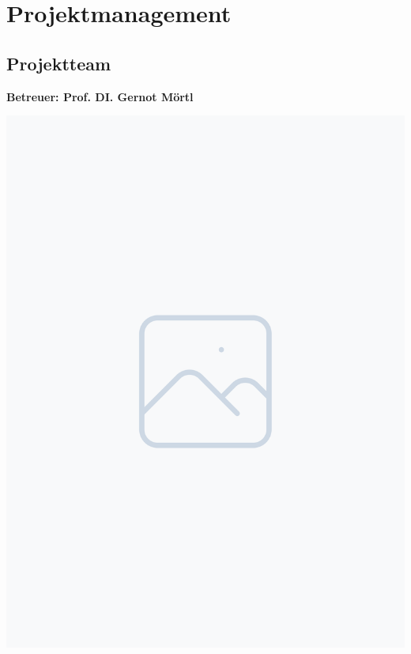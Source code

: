 \documentclass[ngerman,12pt,a4paper]{article}
\begin{document}
	\section{Projektmanagement}
	
		\subsection{Projektteam} %
		\vspace{-10pt}
		\begin{center}
		\textbf{Betreuer: Prof. DI. Gernot Mörtl}\\[1cm]
			\begin{minipage}{0.2\textwidth}
				\includegraphics[width=\linewidth]{Pictures/placeholder}
				\label{fig:daniel}
			\end{minipage}
			\hfill
			\begin{minipage}{0.65\textwidth}

\end{minipage}
\end{center}
\end{document}
